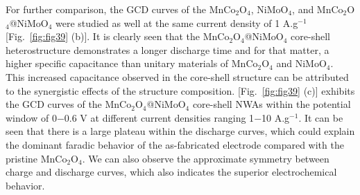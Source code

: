 \documentclass[reprint,amsmath,amssymb,aps,floatfix,
]{revtex4-2}
\begin{document}
For further comparison, the GCD curves of the MnCo$_2$O$_4$, NiMoO$_4$, and MnCo$_2$O$_4$@NiMoO$_4$ were studied as well at the same current density of 1 A.g$^{-1}$ [Fig.~\ref{fig:fig39} (b)]. It is clearly seen that the MnCo$_2$O$_4$@NiMoO$_4$ core-shell heterostructure demonstrates a longer discharge time and for that matter, a higher specific capacitance than unitary materials of MnCo$_2$O$_4$ and NiMoO$_4$. This increased capacitance observed in the core-shell structure can be attributed to the synergistic effects of the structure composition. [Fig.~\ref{fig:fig39} (c)] exhibits the GCD curves of the MnCo$_2$O$_4$@NiMoO$_4$ core-shell NWAs within the potential window of 0$-$0.6 V at different current densities ranging 1$-$10 A.g$^{-1}$. It can be seen that there is a large plateau within the discharge curves, which could explain the dominant faradic behavior of the as-fabricated electrode compared with the pristine MnCo$_2$O$_4$. We can also observe the approximate symmetry between charge and discharge curves, which also indicates the superior electrochemical behavior.
\end{document}
